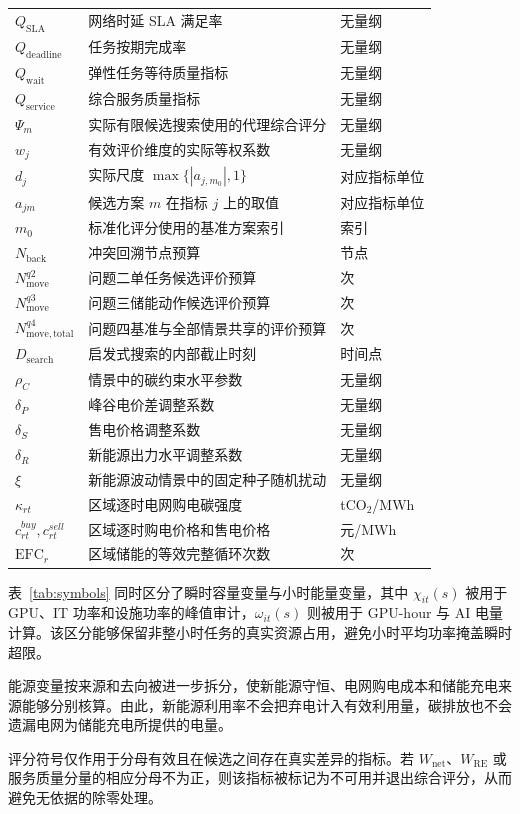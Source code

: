 {\begin{longtable}{lll}
$Q_{\mathrm{SLA}}$ & 网络时延 SLA 满足率 & 无量纲 \\
$Q_{\mathrm{deadline}}$ & 任务按期完成率 & 无量纲 \\
$Q_{\mathrm{wait}}$ & 弹性任务等待质量指标 & 无量纲 \\
$Q_{\mathrm{service}}$ & 综合服务质量指标 & 无量纲 \\
$\Psi_m$ & 实际有限候选搜索使用的代理综合评分 & 无量纲 \\
$w_j$ & 有效评价维度的实际等权系数 & 无量纲 \\
$d_j$ & 实际尺度 $\max\{|a_{j,m_0}|,1\}$ & 对应指标单位 \\
$a_{jm}$ & 候选方案 $m$ 在指标 $j$ 上的取值 & 对应指标单位 \\
$m_0$ & 标准化评分使用的基准方案索引 & 索引 \\
$N_{\mathrm{back}}$ & 冲突回溯节点预算 & 节点 \\
$N_{\mathrm{move}}^{q2}$ & 问题二单任务候选评价预算 & 次 \\
$N_{\mathrm{move}}^{q3}$ & 问题三储能动作候选评价预算 & 次 \\
$N_{\mathrm{move,total}}^{q4}$ & 问题四基准与全部情景共享的评价预算 & 次 \\
$D_{\mathrm{search}}$ & 启发式搜索的内部截止时刻 & 时间点 \\
$\rho_C$ & 情景中的碳约束水平参数 & 无量纲 \\
$\delta_P$ & 峰谷电价差调整系数 & 无量纲 \\
$\delta_S$ & 售电价格调整系数 & 无量纲 \\
$\delta_R$ & 新能源出力水平调整系数 & 无量纲 \\
$\xi$ & 新能源波动情景中的固定种子随机扰动 & 无量纲 \\
$\kappa_{rt}$ & 区域逐时电网购电碳强度 & tCO$_2$/MWh \\
$c_{rt}^{buy},c_{rt}^{sell}$ & 区域逐时购电价格和售电价格 & 元/MWh \\
$\mathrm{EFC}_r$ & 区域储能的等效完整循环次数 & 次 \\
\end{longtable}
}

表~\ref{tab:symbols} 同时区分了瞬时容量变量与小时能量变量，其中 $\chi_{it}(s)$ 被用于 GPU、IT 功率和设施功率的峰值审计，$\omega_{it}(s)$ 则被用于 GPU-hour 与 AI 电量计算。该区分能够保留非整小时任务的真实资源占用，避免小时平均功率掩盖瞬时超限。

能源变量按来源和去向被进一步拆分，使新能源守恒、电网购电成本和储能充电来源能够分别核算。由此，新能源利用率不会把弃电计入有效利用量，碳排放也不会遗漏电网为储能充电所提供的电量。

评分符号仅作用于分母有效且在候选之间存在真实差异的指标。若 $W_{\mathrm{net}}$、$W_{\mathrm{RE}}$ 或服务质量分量的相应分母不为正，则该指标被标记为不可用并退出综合评分，从而避免无依据的除零处理。
